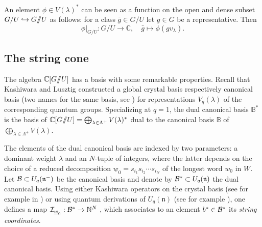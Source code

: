 \documentclass{emsprocart}
\theoremstyle{definition}
\begin{document}
An element $\phi\in V(\lambda)^*$ can be seen as a function on the open and dense subset $G/U\hookrightarrow G/\hskip -3.5pt/U$
as follows: for a class $\bar g\in G/U$ let $g\in G$ be a representative. Then 
\begin{equation}\label{coordinatefunction}
\phi\vert_{G/U}: G/U\rightarrow \mathbb C,\quad \bar g\mapsto \phi(g v_\lambda).
\end{equation}


\subsection{The string cone}\label{thestringcone}
The algebra $\mathbb C[G/\hskip -3.5pt/U]$ has a basis with some remarkable properties.
Recall that Kashiwara and Lusztig constructed a
global crystal basis respectively canonical basis (two names for the same basis, see \cite{GrL}) for representations $V_q(\lambda)$
of the corresponding quantum groups.
Specializing at $q=1$, the dual canonical basis $\mathbb B^*$  is the basis of
$\mathbb C[G/\hskip -3.5pt/U]=\bigoplus_{\lambda\in\Lambda^+}V(\lambda)^*$ dual to the canonical basis $\mathbb{B}$
of $\bigoplus_{\lambda\in\Lambda^+}V(\lambda)$.

The elements of the dual canonical basis are indexed by two parameters: a dominant weight
$\lambda$ and an $N$-tuple of integers, where the latter depends on
the choice of a reduced decomposition $\underline{w}_0=s_{i_1} s_{i_2}\cdots s_{i_N}$ 
of the longest word $w_0$ in $W$. Let ${\cal B}\subset U_q(\mathfrak n^-)$    be the canonical basis and denote
by ${\cal B^*}\subset U_q(\mathfrak n)$   the dual canonical basis.
Using either Kashiwara operators on the crystal basis (see for example in \cite{L3}) or using quantum derivations of $U_q(\mathfrak n)$ (see for example \cite{Ca1}),
one defines a map ${\cal I}_{\underline{w}_0}: {\cal B^*}\rightarrow \mathbb N^N$ , which associates to an element  $b^*\in {\cal B^*}$  its {\it string coordinates}.
\end{document}
